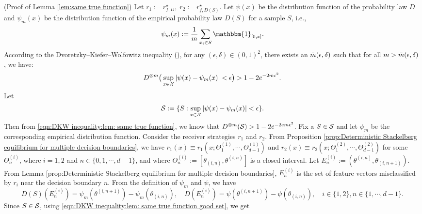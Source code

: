 \begin{apdxproof}(Proof of Lemma \ref{lem:same true function})\label{proof:same true function}
Let $r_1 := r^\star_{f,D},\; r_2 := r^\star_{f,D(S)}$. Let $\psi(x)$ be the distribution function of the probability law $D$ and $\psi_m(x)$ be the distribution function of the empirical probability law $D(S)$ for a sample $S$, i.e.,
    \begin{equation*}
        \psi_m(x) := \frac{1}{m} \sum_{x_i \in S} \mathbbm{1}_{[0,x]}.
    \end{equation*}
According to the Dvoretzky–Kiefer–Wolfowitz inequality (\cite{Dvoretzky-Kiefer-Wolfowitz-1956}), for any $(\epsilon, \delta) \in (0,1)^2$, there exists an $\bar{m}(\epsilon,\delta)$ such that for all $m > \bar{m}(\epsilon,\delta)$, we have:
    \begin{equation}\label{eqn:DKW inequality:lem: same true function}
        D^{\otimes m}\big(\sup_{x \in \mathcal{X}} |\psi(x) - \psi_m(x)| < \epsilon\big) > 1 - 2e^{-2m\epsilon^2}.
    \end{equation}
Let 
\begin{equation}\label{eqn:DKW inequality:lem: same true function good set}
    \mathcal{S} := \{S: \sup_{x \in \mathcal{X}}|\psi(x) - \psi_m(x)| < \epsilon\}.
\end{equation}
Then from \eqref{eqn:DKW inequality:lem: same true function}, we know that $D^{\otimes m}(\mathcal{S}) > 1-2e^{-2em\epsilon^2}$. Fix a $S \in \mathcal{S}$ and let $\psi_m$ be the corresponding empirical distribution function. 
Consider the receiver strategies $r_1$ and $r_2$. From Proposition \ref{prop:Deterministic Stackelberg equilibrium for multiple decision boundaries}, we have $r_1(x) \equiv r_1(x; \Theta^{(1)}_1,\cdots,\Theta^{(1)}_{d-1})$ and $r_2(x) \equiv r_2(x;\Theta^{(2)}_1,\cdots,\Theta^{(2)}_{d-1})$ for some $\Theta^{(i)}_n$, where $i = 1, 2$ and $n \in \{0,1,\cdots,d-1\}$, and where $\Theta^{(i)}_n := [\theta_{(i,n)}, \theta^{(i,n)}]$ is a closed interval. Let $E_n^{(i)} := (\theta^{(i,n)}, \theta_{(i,n+1)})$. From Lemma \ref{prop:Deterministic Stackelberg equilibrium for multiple decision boundaries}, $E_n^{(i)}$ is the set of feature vectors misclassified by $r_i$ near the decision boundary $n$. From the definition of $\psi_m$ and $\psi$, we have
    \begin{equation*}
        D(S)(E_n^{(i)}) = \psi_m(\theta^{(i,n+1)}) - \psi_m(\theta_{(i,n)}),\quad D(E_n^{(i)}) = \psi(\theta^{(i,n+1)}) - \psi(\theta_{(i,n)}),\quad i \in \{1, 2\}, n \in \{1,\cdots,d-1\}.
    \end{equation*}
Since $S \in \mathcal{S}$, using \eqref{eqn:DKW inequality:lem: same true function good set}, we get 

\end{apdxproof}
